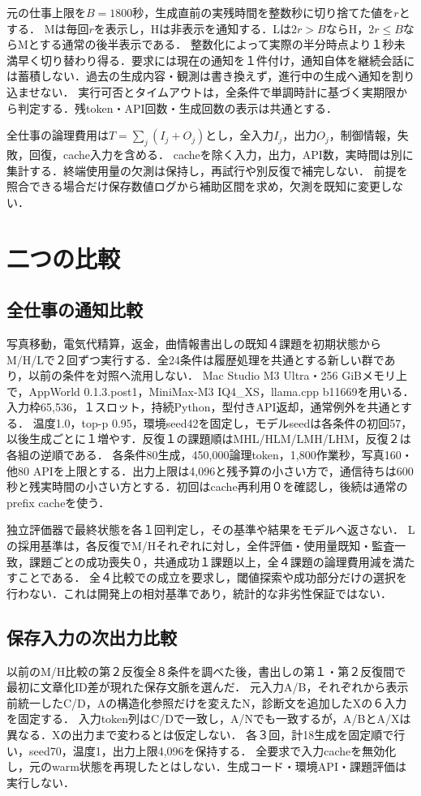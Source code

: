 \documentclass[uplatex,a4paper,twocolumn,10pt]{jsarticle}
\begin{document}
元の仕事上限を$B=1800$秒，生成直前の実残時間を整数秒に切り捨てた値を$r$とする．
Mは毎回$r$を表示し，Hは非表示を通知する．Lは$2r>B$ならH，$2r\leq B$ならMとする通常の後半表示である．
整数化によって実際の半分時点より１秒未満早く切り替わり得る．要求には現在の通知を１件付け，通知自体を継続会話には蓄積しない．過去の生成内容・観測は書き換えず，進行中の生成へ通知を割り込ませない．
実行可否とタイムアウトは，全条件で単調時計に基づく実期限から判定する．残token・API回数・生成回数の表示は共通とする．

全仕事の論理費用は$T=\sum_j(I_j+O_j)$とし，全入力$I_j$，出力$O_j$，制御情報，失敗，回復，cache入力を含める．
cacheを除く入力，出力，API数，実時間は別に集計する．終端使用量の欠測は保持し，再試行や別反復で補完しない．
前提を照合できる場合だけ保存数値ログから補助区間を求め，欠測を既知に変更しない．

\section{二つの比較}
\subsection{全仕事の通知比較}
写真移動，電気代精算，返金，曲情報書出しの既知４課題を初期状態からM/H/Lで２回ずつ実行する．全24条件は履歴処理を共通とする新しい群であり，以前の条件を対照へ流用しない．
Mac Studio M3 Ultra・256 GiBメモリ上で，AppWorld 0.1.3.post1，MiniMax-M3 IQ4\_XS，llama.cpp b11669を用いる．入力枠65,536，１スロット，持続Python，型付きAPI返却，通常例外を共通とする．
温度1.0，top-p 0.95，環境seed42を固定し，モデルseedは各条件の初回57，以後生成ごとに１増やす．反復１の課題順はMHL/HLM/LMH/LHM，反復２は各組の逆順である．
各条件80生成，450,000論理token，1,800作業秒，写真160・他80 APIを上限とする．出力上限は4,096と残予算の小さい方で，通信待ちは600秒と残実時間の小さい方とする．初回はcache再利用０を確認し，後続は通常のprefix cacheを使う．

独立評価器で最終状態を各１回判定し，その基準や結果をモデルへ返さない．
Lの採用基準は，各反復でM/Hそれぞれに対し，全件評価・使用量既知・監査一致，課題ごとの成功喪失０，共通成功１課題以上，全４課題の論理費用減を満たすことである．
全４比較での成立を要求し，閾値探索や成功部分だけの選択を行わない．これは開発上の相対基準であり，統計的な非劣性保証ではない．

\subsection{保存入力の次出力比較}
以前のM/H比較の第２反復全８条件を調べた後，書出しの第１・第２反復間で最初に文章化ID差が現れた保存文脈を選んだ．
元入力A/B，それぞれから表示前統一したC/D，Aの構造化参照だけを変えたN，診断文を追加したXの６入力を固定する．
入力token列はC/Dで一致し，A/Nでも一致するが，A/BとA/Xは異なる．Xの出力まで変わるとは仮定しない．
各３回，計18生成を固定順で行い，seed70，温度1，出力上限4,096を保持する．
全要求で入力cacheを無効化し，元のwarm状態を再現したとはしない．生成コード・環境API・課題評価は実行しない．
\end{document}
